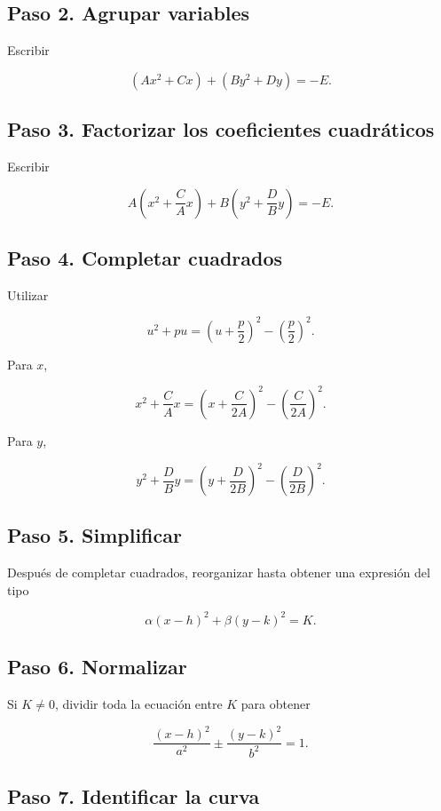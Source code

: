 \documentclass[12pt]{article}
\begin{document}
{\subsection*{Paso 2. Agrupar variables}

Escribir

\[
(Ax^2+Cx)+(By^2+Dy)=-E.
\]

\subsection*{Paso 3. Factorizar los coeficientes cuadráticos}

Escribir

\[
A\left(
x^2+\frac{C}{A}x
\right)
+
B\left(
y^2+\frac{D}{B}y
\right)
=
-E.
\]

\subsection*{Paso 4. Completar cuadrados}

Utilizar

\[
u^2+pu
=
\left(
u+\frac{p}{2}
\right)^2
-
\left(
\frac{p}{2}
\right)^2.
\]

Para \(x\),

\[
x^2+\frac{C}{A}x
=
\left(
x+\frac{C}{2A}
\right)^2
-
\left(
\frac{C}{2A}
\right)^2.
\]

Para \(y\),

\[
y^2+\frac{D}{B}y
=
\left(
y+\frac{D}{2B}
\right)^2
-
\left(
\frac{D}{2B}
\right)^2.
\]

\subsection*{Paso 5. Simplificar}

Después de completar cuadrados, reorganizar hasta obtener una expresión
del tipo

\[
\alpha(x-h)^2+\beta(y-k)^2=K.
\]

\subsection*{Paso 6. Normalizar}

Si \(K\neq0\), dividir toda la ecuación entre \(K\) para obtener

\[
\frac{(x-h)^2}{a^2}
\pm
\frac{(y-k)^2}{b^2}
=
1.
\]

\subsection*{Paso 7. Identificar la curva}

}
\end{document}
